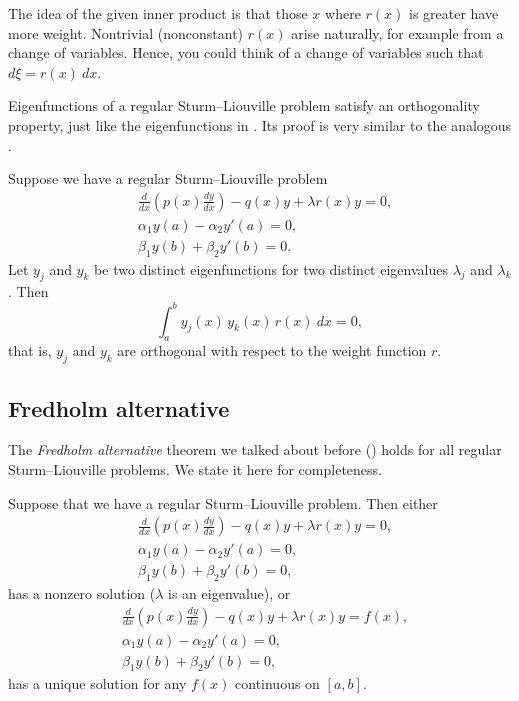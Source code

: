 The idea of the given inner product is that those $x$ where $r(x)$
is greater have more weight.
Nontrivial (nonconstant)
$r(x)$ arise naturally, for example from a change of variables.
Hence, you could
think of a change of variables such that $d\xi = r(x)~ dx$.

Eigenfunctions of a
regular Sturm--Liouville problem satisfy an orthogonality property, just
like the eigenfunctions in .
Its proof is very similar to the analogous 
.

\begin{theorem}
Suppose we have a regular Sturm--Liouville problem
\begin{align*}
&\frac{d}{dx} \left( p(x) \frac{dy}{dx} \right)
- q(x) y + \lambda r(x) y = 0 , \\
&\alpha_1 y(a) - \alpha_2 y'(a) = 0 , \\
&\beta_1 y(b) + \beta_2 y'(b) = 0 .
\end{align*}
Let $y_j$ and $y_k$ be two distinct eigenfunctions for two
distinct eigenvalues $\lambda_j$ and $\lambda_k$.  Then
\begin{equation*}
\int_a^b y_j(x) \, y_k(x) \, r(x) ~dx = 0,
\end{equation*}
that is, $y_j$ and $y_k$ are orthogonal with respect to the weight function
$r$.
\end{theorem}


\subsection{Fredholm alternative}

The \emph{Fredholm alternative} theorem we talked about before
()
holds for all regular Sturm--Liouville problems.
We state it here for completeness.

\begin{theorem}%
Suppose that we have a regular Sturm--Liouville problem.
Then either
\begin{align*}
&\frac{d}{dx} \left( p(x) \frac{dy}{dx} \right)
- q(x) y + \lambda r(x) y = 0 , \\
&\alpha_1 y(a) - \alpha_2 y'(a) = 0 , \\
&\beta_1 y(b) + \beta_2 y'(b) = 0 ,
\end{align*}
has a nonzero solution ($\lambda$ is an eigenvalue), or
\begin{align*}
&\frac{d}{dx} \left( p(x) \frac{dy}{dx} \right)
- q(x) y + \lambda r(x) y = f(x) , \\
&\alpha_1 y(a) - \alpha_2 y'(a) = 0 , \\
&\beta_1 y(b) + \beta_2 y'(b) = 0 ,
\end{align*}
has a unique solution for any $f(x)$ continuous on $[a,b]$.
\end{theorem}

